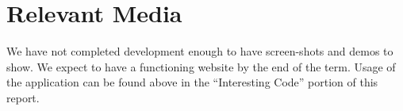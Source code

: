 \section{Relevant Media}

We have not completed development enough to have screen-shots and demos to show.
We expect to have a functioning website by the end of the term.
Usage of the application can be found above in the ``Interesting Code'' portion of this report.




\printbibliography


